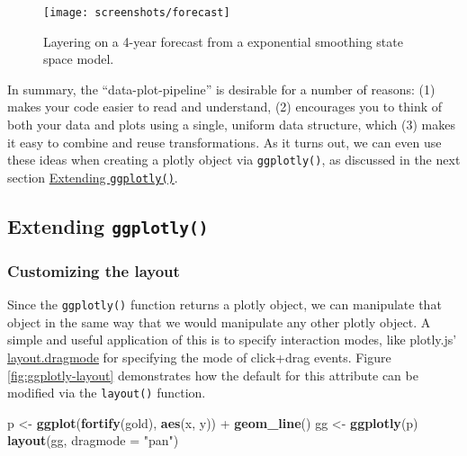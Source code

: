 \documentclass[12pt,]{isuthesis}
\newenvironment{Shaded}{\begin{snugshade}}{\end{snugshade}}
\newcommand{\KeywordTok}[1]{\textcolor[rgb]{0.13,0.29,0.53}{\textbf{{#1}}}}
\newcommand{\DataTypeTok}[1]{\textcolor[rgb]{0.13,0.29,0.53}{{#1}}}
\newcommand{\StringTok}[1]{\textcolor[rgb]{0.31,0.60,0.02}{{#1}}}
\newcommand{\NormalTok}[1]{{#1}}
\begin{document}
\begin{figure}
\centering
\texttt{[image: screenshots/forecast]}
\caption{\label{fig:forecast}Layering on a 4-year forecast from a
exponential smoothing state space model.}
\end{figure}

In summary, the ``data-plot-pipeline'' is desirable for a number of
reasons: (1) makes your code easier to read and understand, (2)
encourages you to think of both your data and plots using a single,
uniform data structure, which (3) makes it easy to combine and reuse
transformations. As it turns out, we can even use these ideas when
creating a plotly object via \texttt{ggplotly()}, as discussed in the
next section \protect\hyperlink{extending-ggplotly}{Extending
\texttt{ggplotly()}}.

\hypertarget{extending-ggplotly}{\subsection{\texorpdfstring{Extending
\texttt{ggplotly()}}{Extending ggplotly()}}\label{extending-ggplotly}}

\subsubsection{Customizing the layout}\label{customizing-the-layout}

Since the \texttt{ggplotly()} function returns a plotly object, we can
manipulate that object in the same way that we would manipulate any
other plotly object. A simple and useful application of this is to
specify interaction modes, like plotly.js'
\href{https://plot.ly/r/reference/\#layout-dragmode}{layout.dragmode}
for specifying the mode of click+drag events. Figure
\ref{fig:ggplotly-layout} demonstrates how the default for this
attribute can be modified via the \texttt{layout()} function.

\begin{Shaded}
\begin{Highlighting}[]
\NormalTok{p <-}\StringTok{ }\KeywordTok{ggplot}\NormalTok{(}\KeywordTok{fortify}\NormalTok{(gold), }\KeywordTok{aes}\NormalTok{(x, y)) +}\StringTok{ }\KeywordTok{geom_line}\NormalTok{()}
\NormalTok{gg <-}\StringTok{ }\KeywordTok{ggplotly}\NormalTok{(p)}
\KeywordTok{layout}\NormalTok{(gg, }\DataTypeTok{dragmode =} \StringTok{"pan"}\NormalTok{)}
\end{Highlighting}
\end{Shaded}
\end{document}
